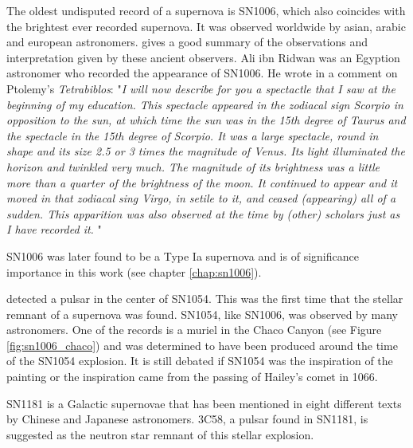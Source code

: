 The oldest undisputed record of a supernova is SN1006, which also coincides with the brightest ever recorded supernova.  It was observed worldwide by asian, arabic and european astronomers. \citet{1965AJ.....70..105G} gives a good summary of the observations and interpretation given by these ancient observers. Ali ibn Ridwan was an Egyption astronomer who recorded the appearance of SN1006. He wrote in a comment on Ptolemy's \textit{Tetrabiblos}: "\textit{I will now describe for you a spectactle that I saw at the beginning of my education. This spectacle appeared in the zodiacal sign Scorpio in opposition to the sun, at which time the sun was in the 15th degree of Taurus and the spectacle in the 15th degree of Scorpio. It was a large spectacle, round in shape and its size 2.5 or 3 times the magnitude of Venus. Its light illuminated the horizon and twinkled very much. The magnitude of its brightness was a little more than a quarter of the brightness of the moon. It continued to appear and it moved in that zodiacal sing Virgo, in setile to it, and ceased (appearing) all of  a sudden. This apparition was also observed at the time by (other) scholars just as I have recorded it. }"

SN1006 was later found to be a Type Ia supernova and is of significance importance in this work (see chapter \ref{chap:sn1006}).

\cite{1968Sci...162.1481S} detected a pulsar in the center of SN1054. This was the first time that the stellar remnant of a supernova was found. SN1054, like SN1006, was observed by many astronomers. One of the records is a muriel in the Chaco Canyon (see Figure \ref{fig:sn1006_chaco}) and was determined to have been produced around the time of the SN1054 explosion. It is still debated if SN1054 was the inspiration of the painting or the inspiration came from the passing of Hailey's comet in 1066. 

SN1181 is a Galactic supernovae that has been mentioned in eight different texts by Chinese and Japanese astronomers. 3C58, a pulsar found in SN1181, is suggested as the neutron star remnant of this stellar explosion. 



